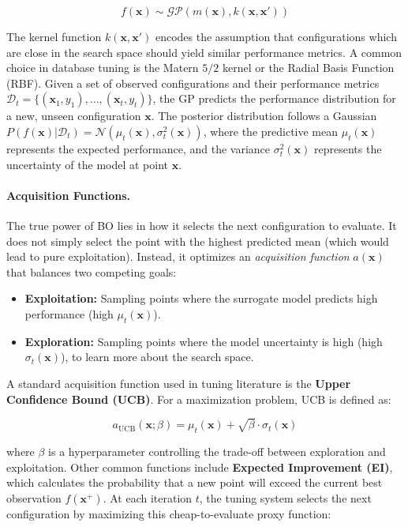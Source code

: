 \[f(\mathbf{x}) \sim \mathcal{GP}(m(\mathbf{x}), k(\mathbf{x}, \mathbf{x}'))\]

The kernel function $k(\mathbf{x}, \mathbf{x}')$ encodes the assumption that configurations which are close in the search space should yield similar performance metrics.
A common choice in database tuning is the Matern $5/2$ kernel or the Radial Basis Function (RBF).
Given a set of observed configurations and their performance metrics $\mathcal{D}_t = \{(\mathbf{x}_1, y_1), \dots, (\mathbf{x}_t, y_t)\}$, the GP predicts the performance distribution for a new, unseen configuration $\mathbf{x}$.
The posterior distribution follows a Gaussian $P(f(\mathbf{x}) | \mathcal{D}_t) = \mathcal{N}(\mu_t(\mathbf{x}), \sigma_t^2(\mathbf{x}))$, where the predictive mean $\mu_t(\mathbf{x})$ represents the expected performance, and the variance $\sigma_t^2(\mathbf{x})$ represents the uncertainty of the model at point $\mathbf{x}$.

\paragraph{Acquisition Functions.}
The true power of BO lies in how it selects the next configuration to evaluate.
It does not simply select the point with the highest predicted mean (which would lead to pure exploitation).
Instead, it optimizes an \textit{acquisition function} $a(\mathbf{x})$ that balances two competing goals:
\begin{itemize}
  \item \textbf{Exploitation:} Sampling points where the surrogate model predicts high performance (high $\mu_t(\mathbf{x})$).
  \item \textbf{Exploration:} Sampling points where the model uncertainty is high (high $\sigma_t(\mathbf{x})$), to learn more about the search space.
\end{itemize}
A standard acquisition function used in tuning literature is the \textbf{Upper Confidence Bound (UCB)}. For a maximization problem, UCB is defined as:

\[a_{\text{UCB}}(\mathbf{x}; \beta) = \mu_t(\mathbf{x}) + \sqrt{\beta} \cdot \sigma_t(\mathbf{x})\]

where $\beta$ is a hyperparameter controlling the trade-off between exploration and exploitation. Other common functions include \textbf{Expected Improvement (EI)}, which calculates the probability that a new point will exceed the current best observation $f(\mathbf{x}^+)$.
At each iteration $t$, the tuning system selects the next configuration by maximizing this cheap-to-evaluate proxy function:

